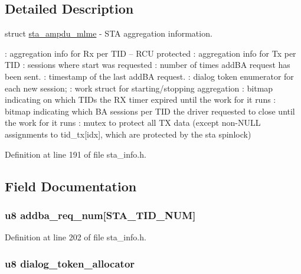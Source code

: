 \subsection{Detailed Description}
struct \hyperlink{structsta__ampdu__mlme}{sta\-\_\-ampdu\-\_\-mlme} -\/ S\-T\-A aggregation information.

\-: aggregation info for Rx per T\-I\-D -- R\-C\-U protected \-: aggregation info for Tx per T\-I\-D \-: sessions where start was requested \-: number of times add\-B\-A request has been sent. \-: timestamp of the last add\-B\-A request. \-: dialog token enumerator for each new session; \-: work struct for starting/stopping aggregation \-: bitmap indicating on which T\-I\-Ds the R\-X timer expired until the work for it runs \-: bitmap indicating which B\-A sessions per T\-I\-D the driver requested to close until the work for it runs \-: mutex to protect all T\-X data (except non-\/\-N\-U\-L\-L assignments to tid\-\_\-tx\mbox{[}idx\mbox{]}, which are protected by the sta spinlock) 

Definition at line 191 of file sta\-\_\-info.\-h.



\subsection{Field Documentation}
\hypertarget{structsta__ampdu__mlme_a87d5e7167b24cc6e336ecf08e9e15d06}{
\subsubsection[{addba\-\_\-req\-\_\-num}]{\setlength{\rightskip}{0pt plus 5cm}u8 addba\-\_\-req\-\_\-num\mbox{[}{\bf S\-T\-A\-\_\-\-T\-I\-D\-\_\-\-N\-U\-M}\mbox{]}}}\label{structsta__ampdu__mlme_a87d5e7167b24cc6e336ecf08e9e15d06}


Definition at line 202 of file sta\-\_\-info.\-h.

\hypertarget{structsta__ampdu__mlme_a8dd4efd8eb6b5f60ae2295f55a4600a4}{
\subsubsection[{dialog\-\_\-token\-\_\-allocator}]{\setlength{\rightskip}{0pt plus 5cm}u8 dialog\-\_\-token\-\_\-allocator}}\label{structsta__ampdu__mlme_a8dd4efd8eb6b5f60ae2295f55a4600a4}


